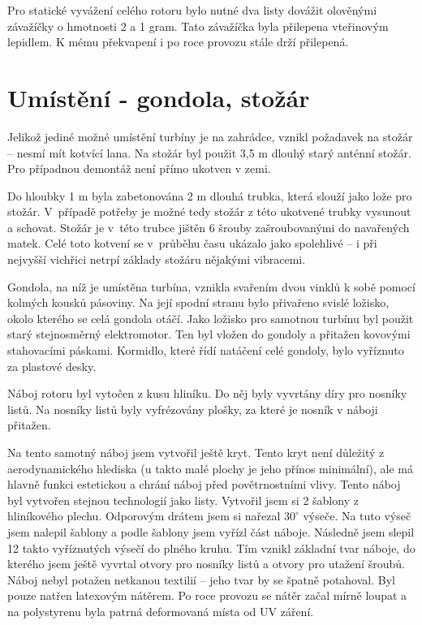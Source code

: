 Pro statické vyvážení celého rotoru bylo nutné dva listy dovážit olověnými závažíčky o hmotnosti 2 a 1 gram. Tato závažíčka byla přilepena vteřinovým lepidlem. K mému překvapení i po roce provozu stále drží přilepená.

\section{Umístění - gondola, stožár}
Jelikož jediné možné umístění turbíny je na zahrádce, vznikl požadavek na stožár – nesmí mít kotvící lana. Na stožár byl použit 3,5 m dlouhý starý anténní stožár. Pro případnou demontáž není přímo ukotven v zemi.

Do hloubky 1 m byla zabetonována 2 m dlouhá trubka, která slouží jako lože pro stožár. V~případě potřeby je možné tedy stožár z této ukotvené trubky vysunout a schovat. Stožár je v~této trubce jištěn 6 šrouby zašroubovanými do navařených matek. Celé toto kotvení se v~průběhu času ukázalo jako spolehlivé – i při nejvyšší vichřici netrpí základy stožáru nějakými vibracemi.

Gondola, na níž je umístěna turbína, vznikla svařením dvou vinklů k sobě pomocí kolmých kousků pásoviny. Na její spodní stranu bylo přivařeno svislé ložisko, okolo kterého se celá gondola otáčí. Jako ložisko pro samotnou turbínu byl použit starý stejnosměrný elektromotor. Ten byl vložen do gondoly a přitažen kovovými stahovacími páskami. Kormidlo, které řídí natáčení celé gondoly, bylo vyříznuto za plastové desky.

Náboj rotoru byl vytočen z kusu hliníku. Do něj byly vyvrtány díry pro nosníky listů. Na nosníky listů byly vyfrézovány plošky, za které je nosník v náboji přitažen.

Na tento samotný náboj jsem vytvořil ještě kryt. Tento kryt není důležitý z aerodynamického hlediska (u takto malé plochy je jeho přínos minimální), ale má hlavně funkci estetickou a chrání náboj před povětrnostními vlivy. Tento náboj byl vytvořen stejnou technologií jako listy. Vytvořil jsem si 2 šablony z hliníkového plechu. Odporovým drátem jsem si nařezal $30^{\circ}$ výseče. Na tuto výseč jsem nalepil šablony a podle šablony jsem vyřízl část náboje. Následně jsem slepil 12 takto vyříznutých výsečí do plného kruhu. Tím vznikl základní tvar náboje, do kterého jsem ještě vyvrtal otvory pro nosníky listů a otvory pro utažení šroubů. Náboj nebyl potažen netkanou textilií – jeho tvar by se špatně potahoval. Byl pouze natřen latexovým nátěrem. Po roce provozu se nátěr začal mírně loupat a na polystyrenu byla patrná deformovaná místa od UV záření.

